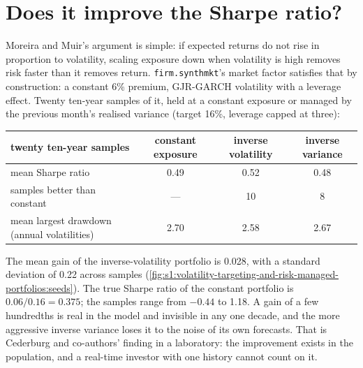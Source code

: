 \section{Does it improve the Sharpe ratio?}

Moreira and Muir's argument is simple: if expected returns do not rise in proportion to volatility, scaling exposure down when volatility is high
removes risk faster than it removes return. \texttt{firm.synthmkt}'s market factor satisfies that by construction: a constant 6\% premium, GJR-GARCH
volatility with a leverage effect. Twenty ten-year samples of it, held at a constant exposure or managed by the previous month's realised variance
(target 16\%, leverage capped at three):

\begin{center}
\small
\begin{tabular}{@{}lccc@{}}
\toprule
twenty ten-year samples & constant exposure & inverse volatility & inverse variance\\
\midrule
mean Sharpe ratio & 0.49 & 0.52 & 0.48\\
samples better than constant & --- & 10 & 8\\
mean largest drawdown (annual volatilities) & 2.70 & 2.58 & 2.67\\
\bottomrule
\end{tabular}
\end{center}

The mean gain of the inverse-volatility portfolio is 0.028, with a standard deviation of 0.22 across samples
(\cref{fig:s1:volatility-targeting-and-risk-managed-portfolios:seeds}). The true Sharpe ratio of the constant portfolio is $0.06/0.16 = 0.375$; the
samples range from $-0.44$ to 1.18. A gain of a few hundredths is real in the model and invisible in any one decade, and the more aggressive inverse
variance loses it to the noise of its own forecasts. That is Cederburg and co-authors' finding in a laboratory: the improvement exists in the
population, and a real-time investor with one history cannot count on it.

